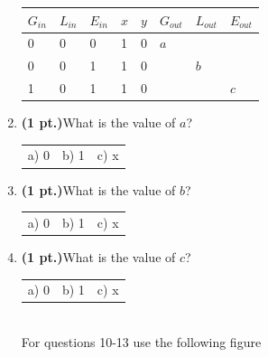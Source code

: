 \documentclass{article}
\begin{document}
\begin{enumerate}
\begin{tabular}{l|l|l|l|l||l|l|l}
$G_{in}$ & $L_{in}$ & $E_{in}$ & $x$ & $y$ & $G_{out}$ & $L_{out}$ & $E_{out}$ \\ \hline
    0    &    0     &     0    &  1  &  0  &   $a$     &           &           \\ \hline
    0    &    0     &     1    &  1  &  0  &           &   $b$     &           \\ \hline
    1    &    0     &     1    &  1  &  0  &           &           &    $c$    \\
\end{tabular}

\item {\bf (1 pt.)}What is the value of $a$?

\begin{tabular}{p{0.6in} p{0.6in} p{0.6in}}
a) 0 & b) 1 & c) x 
\end{tabular}

\item {\bf (1 pt.)}What is the value of $b$?

\begin{tabular}{p{0.6in} p{0.6in} p{0.6in}}
a) 0 & b) 1 & c) x 
\end{tabular}

\item {\bf (1 pt.)}What is the value of $c$?

\begin{tabular}{p{0.6in} p{0.6in} p{0.6in}}
a) 0 & b) 1 & c) x 
\end{tabular} \\

For questions 10-13 use the following figure


\end{enumerate}
\end{document}
